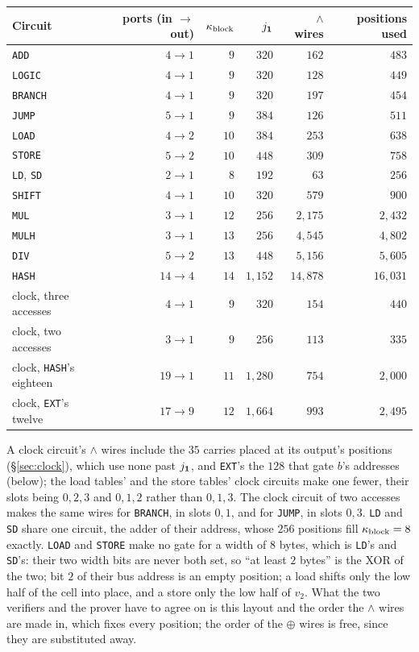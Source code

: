 \begin{center}
\begin{tabular}{lrrrrr}
\hline
Circuit & ports (in $\to$ out) & $\kappa_{\mathrm{block}}$ & $j_{\mathbf{1}}$ & $\wedge$ wires & positions used\\
\hline
\texttt{ADD}   & $4\to1$  & $9$  & $320$   & $162$      & $483$\\
\texttt{LOGIC} & $4\to1$  & $9$  & $320$   & $128$      & $449$\\
\texttt{BRANCH} & $4\to1$ & $9$  & $320$   & $197$      & $454$\\
\texttt{JUMP}  & $5\to1$  & $9$  & $384$   & $126$      & $511$\\
\texttt{LOAD}  & $4\to2$  & $10$ & $384$   & $253$      & $638$\\
\texttt{STORE} & $5\to2$  & $10$ & $448$   & $309$      & $758$\\
\texttt{LD}, \texttt{SD} & $2\to1$ & $8$ & $192$ & $63$ & $256$\\
\texttt{SHIFT} & $4\to1$  & $10$ & $320$   & $579$      & $900$\\
\texttt{MUL}   & $3\to1$  & $12$ & $256$   & $2{,}175$  & $2{,}432$\\
\texttt{MULH}  & $3\to1$  & $13$ & $256$   & $4{,}545$  & $4{,}802$\\
\texttt{DIV}   & $5\to2$  & $13$ & $448$   & $5{,}156$  & $5{,}605$\\
\texttt{HASH}  & $14\to4$ & $14$ & $1{,}152$ & $14{,}878$ & $16{,}031$\\
\hline
clock, three accesses & $4\to1$ & $9$ & $320$ & $154$ & $440$\\
clock, two accesses & $3\to1$ & $9$ & $256$ & $113$ & $335$\\
clock, \texttt{HASH}'s eighteen & $19\to1$ & $11$ & $1{,}280$ & $754$ & $2{,}000$\\
clock, \texttt{EXT}'s twelve & $17\to9$ & $12$ & $1{,}664$ & $993$ & $2{,}495$\\
\hline
\end{tabular}
\end{center}
A clock circuit's $\wedge$ wires include the $35$ carries placed at its output's positions (\S\ref{sec:clock}), which use none past $j_{\mathbf{1}}$, and \texttt{EXT}'s the $128$ that gate $b$'s addresses (below); the load tables' and the store tables' clock circuits make one fewer, their slots being $0,2,3$ and $0,1,2$ rather than $0,1,3$. The clock circuit of two accesses makes the same wires for \texttt{BRANCH}, in slots $0,1$, and for \texttt{JUMP}, in slots $0,3$. \texttt{LD} and \texttt{SD} share one circuit, the adder of their address, whose $256$ positions fill $\kappa_{\mathrm{block}}=8$ exactly. \texttt{LOAD} and \texttt{STORE} make no gate for a width of $8$ bytes, which is \texttt{LD}'s and \texttt{SD}'s: their two width bits are never both set, so ``at least $2$ bytes'' is the XOR of the two; bit $2$ of their bus address is an empty position; a load shifts only the low half of the cell into place, and a store only the low half of $v_2$.
What the two verifiers and the prover have to agree on is this layout and the order the $\wedge$ wires are made in, which fixes every position; the order of the $\oplus$ wires is free, since they are substituted away.

